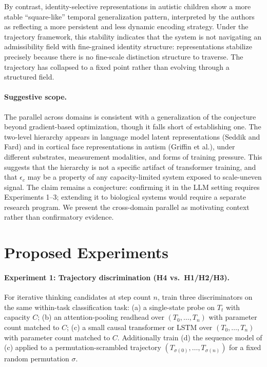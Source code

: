 \documentclass[11pt]{article}
\begin{document}
By contrast, identity-selective representations in autistic children show a more stable
``square-like'' temporal generalization pattern, interpreted by the authors as reflecting a
more persistent and less dynamic encoding strategy. Under the trajectory framework, this
stability indicates that the system is not navigating an admissibility field with fine-grained
identity structure: representations stabilize precisely because there is no fine-scale
distinction structure to traverse. The trajectory has collapsed to a fixed point rather than
evolving through a structured field.

\paragraph{Suggestive scope.}
The parallel across domains is consistent with a generalization of the conjecture beyond
gradient-based optimization, though it falls short of establishing one. The two-level hierarchy
appears in language model latent representations (Seddik and Fard) and in cortical face
representations in autism (Griffin et al.), under different substrates, measurement modalities,
and forms of training pressure. This suggests that the hierarchy is not a specific artifact of
transformer training, and that $\epsilon_c$ may be a property of any capacity-limited system
exposed to scale-uneven signal. The claim remains a conjecture: confirming it in the LLM setting
requires Experiments 1--3; extending it to biological systems would require a separate research
program. We present the cross-domain parallel as motivating context rather than confirmatory
evidence.

\section{Proposed Experiments}
\label{sec:experiments}

\paragraph{Experiment 1: Trajectory discrimination (H4 vs.\ H1/H2/H3).}
For iterative thinking candidates at step count $n$, train three discriminators on the same
within-task classification task: (a) a single-state probe on $T_t$ with capacity $C$; (b) an
attention-pooling readhead over $(T_0, \ldots, T_n)$ with parameter count matched to $C$; (c)
a small causal transformer or LSTM over $(T_0, \ldots, T_n)$ with parameter count matched to
$C$. Additionally train (d) the sequence model of (c) applied to a permutation-scrambled
trajectory $(T_{\sigma(0)}, \ldots, T_{\sigma(n)})$ for a fixed random permutation $\sigma$.
\end{document}
